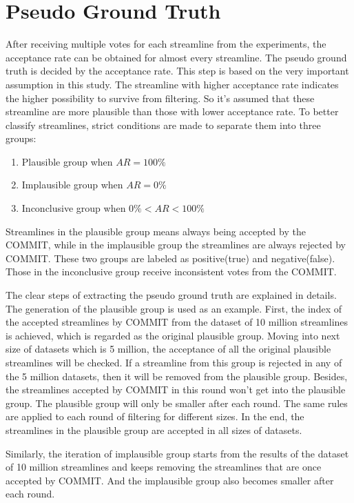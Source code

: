 \section{Pseudo Ground Truth}

After receiving multiple votes for each streamline from the experiments, the acceptance rate can be obtained for almost every streamline.
The pseudo ground truth is decided by the acceptance rate. This step is based on the very important assumption in this study.
The streamline with higher acceptance rate indicates the higher possibility to survive from filtering. 
So it's assumed that these streamline are more plausible than those with lower acceptance rate.
To better classify streamlines, strict conditions are made to separate them into three groups:

\begin{enumerate}
    \item Plausible group when $AR = 100\%$
    \item Implausible group when $AR = 0\%$
    \item Inconclusive group when $0\% <AR< 100\%$
  \end{enumerate}

Streamlines in the plausible group means always being accepted by the COMMIT, while in the implausible group the streamlines are always rejected by COMMIT.
These two groups are labeled as positive(true) and negative(false). Those in the inconclusive group receive inconsistent votes from the COMMIT. 

The clear steps of extracting the pseudo ground truth are explained in details. The generation of the plausible group is used as an example. 
First, the index of the accepted streamlines by COMMIT from the dataset of 10 million streamlines is achieved, which is regarded as the original plausible group.
Moving into next size of datasets which is 5 million, the acceptance of all the original plausible streamlines will be checked. 
If a streamline from this group is rejected in any of the 5 million datasets, then it will be removed from the plausible group.
Besides, the streamlines accepted by COMMIT in this round won't get into the plausible group. The plausible group will only be smaller after each round.
The same rules are applied to each round of filtering for different sizes. In the end, the streamlines in the plausible group 
are accepted in all sizes of datasets. 

Similarly, the iteration of implausible group starts from the results of the dataset of 10 million streamlines and keeps removing the 
streamlines that are once accepted by COMMIT. And the implausible group also becomes smaller after each round.

